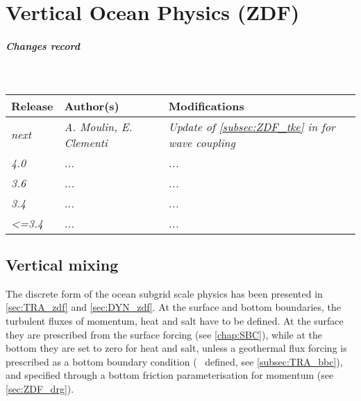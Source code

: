 \documentclass[../main/NEMO_manual]{subfiles}
\begin{document}
\chapter{Vertical Ocean Physics (ZDF)}
\label{chap:ZDF}

\chaptertoc

\paragraph{Changes record} ~\\

{\footnotesize
  \begin{tabularx}{\textwidth}{l||X|X}
    Release & Author(s) & Modifications \\
    \hline
    {\em  next} & {\em A. Moulin, E. Clementi} & {\em Update of \autoref{subsec:ZDF_tke} in for wave coupling}\\[2mm]
    {\em   4.0} & {\em ...} & {\em ...} \\
    {\em   3.6} & {\em ...} & {\em ...} \\
    {\em   3.4} & {\em ...} & {\em ...} \\
    {\em <=3.4} & {\em ...} & {\em ...}
  \end{tabularx}
}

\clearpage


\section{Vertical mixing}
\label{sec:ZDF}

The discrete form of the ocean subgrid scale physics has been presented in
\autoref{sec:TRA_zdf} and \autoref{sec:DYN_zdf}.
At the surface and bottom boundaries, the turbulent fluxes of momentum, heat and salt have to be defined.
At the surface they are prescribed from the surface forcing (see \autoref{chap:SBC}),
while at the bottom they are set to zero for heat and salt,
unless a geothermal flux forcing is prescribed as a bottom boundary condition (\ie\  defined,
see \autoref{subsec:TRA_bbc}), and specified through a bottom friction parameterisation for momentum
(see \autoref{sec:ZDF_drg}).
\end{document}
